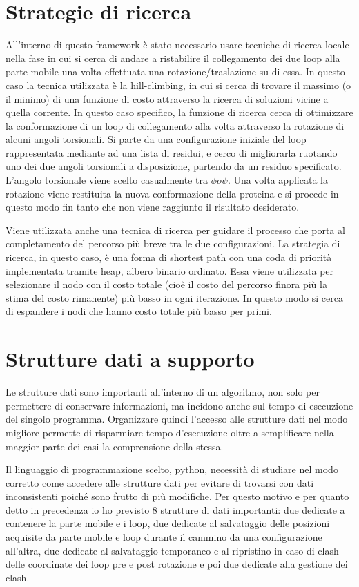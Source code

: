\section{Strategie di ricerca}\label{sec:Strategiediricerca}
All'interno di questo framework è stato necessario usare tecniche di ricerca locale nella fase in cui si cerca di andare a ristabilire il collegamento dei due loop alla parte mobile una volta effettuata una rotazione/traslazione su di essa. In questo caso la tecnica utilizzata è la hill-climbing, in cui si cerca di trovare il massimo (o il minimo) di una funzione di costo attraverso la ricerca di soluzioni vicine a quella corrente. In questo caso specifico, la funzione di ricerca cerca di ottimizzare la conformazione di un loop di collegamento alla volta attraverso la rotazione di alcuni angoli torsionali. Si parte da una configurazione iniziale del loop rappresentata mediante ad una lista di residui, e cerco di migliorarla ruotando uno dei due angoli torsionali a disposizione, partendo da un residuo specificato. L'angolo torsionale viene scelto casualmente tra $\phi o \psi$. Una volta applicata la rotazione viene restituita la nuova conformazione della proteina e si procede in questo modo fin tanto che non viene raggiunto il risultato desiderato. 

Viene utilizzata anche una tecnica di ricerca per guidare il processo che porta al completamento del percorso più breve tra le due configurazioni. La strategia di ricerca, in questo caso, è una forma di shortest path con una coda di priorità implementata tramite heap, albero binario ordinato. Essa viene utilizzata per selezionare il nodo con il costo totale (cioè il costo del percorso finora più la stima del costo rimanente) più basso in ogni iterazione. In questo modo si cerca di espandere i nodi che hanno costo totale più basso per primi. 

\section{Strutture dati a supporto}\label{sec:Strutturedati}
Le strutture dati sono importanti all'interno di un algoritmo, non solo per permettere di conservare informazioni, ma incidono anche sul tempo di esecuzione del singolo programma. Organizzare quindi l'accesso alle strutture dati nel modo migliore permette di risparmiare tempo d'esecuzione oltre a semplificare nella maggior parte dei casi la comprensione della stessa. 

Il linguaggio di programmazione scelto, python, necessità di studiare nel modo corretto come accedere alle strutture dati per evitare di trovarsi con dati inconsistenti poiché sono frutto di più modifiche. Per questo motivo e per quanto detto in precedenza io ho previsto 8 strutture di dati importanti: due dedicate a contenere la parte mobile e i loop, due dedicate al salvataggio delle posizioni acquisite da parte mobile e loop durante il cammino da una configurazione all'altra, due dedicate al salvataggio temporaneo e al ripristino in caso di clash delle coordinate dei loop pre e post rotazione e poi due dedicate alla gestione dei clash.

